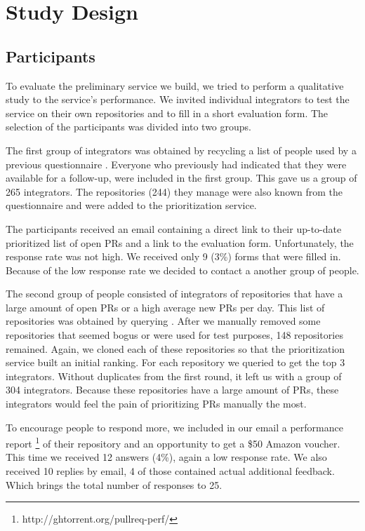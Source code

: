 \section{Study Design}
\label{sec:design}

\subsection{Participants}
To evaluate the preliminary service we build, we tried to perform a qualitative study to the service's performance.
We invited individual integrators to test the service on their own repositories and to fill in a short evaluation form.
The selection of the participants was divided into two groups.

The first group of integrators was obtained by recycling a list of people used by a previous questionnaire \cite{GZSD15}.
Everyone who previously had indicated that they were available for a follow-up, were included in the first group.
This gave us a group of 265 integrators.
The repositories (244) they manage were also known from the questionnaire and were added to the prioritization service.

The participants received an email containing a direct link to their up-to-date prioritized list of open PRs and a link to the evaluation form.
Unfortunately, the response rate was not high.
We received only 9 (3\%) forms that were filled in.
Because of the low response rate we decided to contact a another group of people.

The second group of people consisted of integrators of repositories that have a large amount of open PRs or a high average new PRs per day.
This list of repositories was obtained by querying \ghtorrent.
After we manually removed some repositories that seemed bogus or were used for test purposes, 148 repositories remained.
Again, we cloned each of these repositories so that the prioritization service built an initial ranking.
For each repository we queried \ghtorrent to get the top 3 integrators.
Without duplicates from the first round, it left us with a group of 304 integrators.
Because these repositories have a large amount of PRs, these integrators would feel the pain of prioritizing PRs manually the most.

To encourage people to respond more, we included in our email a performance report \footnote{http://ghtorrent.org/pullreq-perf/} of their repository and an opportunity to get a \$50 Amazon voucher.
This time we received 12 answers (4\%), again a low response rate.
We also received 10 replies by email, 4 of those contained actual additional feedback.
Which brings the total number of responses to 25.
